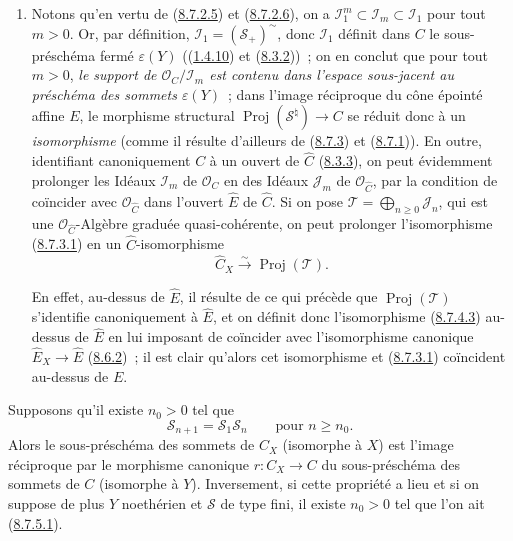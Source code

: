 \begin{remarks}[8.7.4]
\begin{enumerate}
  \item[\rm{(ii)}] Notons qu'en vertu de
  (\hyperref[II.8.7.2.5-fr]{8.7.2.5}) et
  (\hyperref[II.8.7.2.6-fr]{8.7.2.6}), on a
  $\mathcal{I}_1^m\subset\mathcal{I}_m\subset\mathcal{I}_1$ pour tout $m>0$.
  Or, par définition, $\mathcal{I}_1=(\mathcal{S}_+)^{\sim}$, donc
  $\mathcal{I}_1$ définit dans $C$ le sous-préschéma fermé
  $\varepsilon(Y)$ ((\hyperref[II.1.4.10-fr]{1.4.10}) et
  (\hyperref[II.8.3.2-fr]{8.3.2}))~; on en conclut que pour tout $m>0$,
  \emph{le support de $\mathcal{O}_C/\mathcal{I}_m$ est contenu dans l'espace
  sous-jacent au préschéma des sommets $\varepsilon(Y)$}~; dans l'image
  réciproque du cône épointé affine $E$, le morphisme structural
  $\operatorname{Proj}(\mathcal{S}^{\natural})\to C$ se réduit donc à un
  \emph{isomorphisme} (comme il résulte d'ailleurs de
  (\hyperref[II.8.7.3-fr]{8.7.3}) et
  (\hyperref[II.8.7.1-fr]{8.7.1})). En outre, identifiant canoniquement $C$ à
  un ouvert de $\widehat{C}$ (\hyperref[II.8.3.3-fr]{8.3.3}), on peut
  évidemment prolonger les Idéaux $\mathcal{I}_m$ de $\mathcal{O}_C$ en des
  Idéaux $\mathcal{J}_m$ de $\mathcal{O}_{\widehat{C}}$, par la condition de
  coïncider avec $\mathcal{O}_{\widehat{C}}$ dans l'ouvert $\widehat{E}$ de
  $\widehat{C}$. Si on pose
  $\mathcal{T}=\bigoplus_{n\geqslant 0}\mathcal{J}_n$, qui est une
  $\mathcal{O}_{\widehat{C}}$-Algèbre graduée quasi-cohérente, on peut
  prolonger l'isomorphisme (\hyperref[II.8.7.3.1-fr]{8.7.3.1}) en un
  $\widehat{C}$-isomorphisme
  \begin{equation}
  \label{II.8.7.4.3-fr}
    \widehat{C}_X\xrightarrow{\sim}\operatorname{Proj}(\mathcal{T}).
  \tag{8.7.4.3}
  \end{equation}

  En effet, au-dessus de $\widehat{E}$, il résulte de ce qui précède que
  $\operatorname{Proj}(\mathcal{T})$ s'identifie canoniquement à
  $\widehat{E}$, et on définit donc l'isomorphisme
  (\hyperref[II.8.7.4.3-fr]{8.7.4.3}) au-dessus de $\widehat{E}$ en lui
  imposant de coïncider avec l'isomorphisme canonique
  $\widehat{E}_X\to\widehat{E}$ (\hyperref[II.8.6.2-fr]{8.6.2})~; il est clair
  qu'alors cet isomorphisme et (\hyperref[II.8.7.3.1-fr]{8.7.3.1}) coïncident
  au-dessus de $E$.
\end{enumerate}
\end{remarks}

\begin{corollary}[8.7.5]
\label{II.8.7.5-fr}
Supposons qu'il existe $n_0>0$ tel que
\begin{equation}
\label{II.8.7.5.1-fr}
  \mathcal{S}_{n+1}=\mathcal{S}_1\mathcal{S}_n
  \qquad\text{pour }n\geqslant n_0.
\tag{8.7.5.1}
\end{equation}
Alors le sous-préschéma des sommets de $C_X$ (isomorphe à $X$) est l'image
réciproque par le morphisme canonique $r:C_X\to C$ du sous-préschéma des
sommets de $C$ (isomorphe à $Y$). Inversement, si cette propriété a lieu et
si on suppose de plus $Y$ noethérien et $\mathcal{S}$ de type fini, il existe
$n_0>0$ tel que l'on ait \textup{(\hyperref[II.8.7.5.1-fr]{8.7.5.1})}.
\end{corollary}

